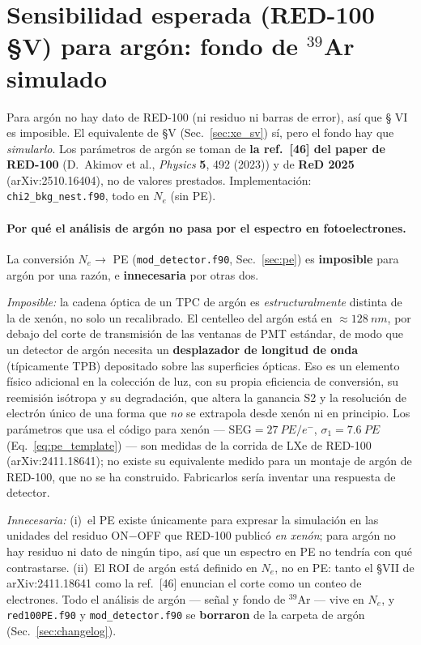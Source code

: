 \documentclass[11pt,a4paper]{article}
\newcommand{\Ne}{N_{e}}
\newcommand{\code}[1]{\texttt{#1}}
\begin{document}
\section{Sensibilidad esperada (RED-100 \S V) para arg\'on: fondo de
$^{39}$Ar simulado}
\label{sec:ar_sv}

Para arg\'on no hay dato de RED-100 (ni residuo ni barras de error), as\'i que \S
VI es imposible. El equivalente de \S V (Sec.~\ref{sec:xe_sv}) s\'i, pero el
fondo hay que \emph{simularlo}. Los par\'ametros de arg\'on se toman de
\textbf{la ref.\ [46] del paper de RED-100} (D.\ Akimov et al., \emph{Physics}
\textbf{5}, 492 (2023)) y de \textbf{ReD 2025} (arXiv:2510.16404), no de valores
prestados. Implementaci\'on: \code{chi2\_bkg\_nest.f90}, todo en $\Ne$ (sin PE).

\paragraph{Por qu\'e el an\'alisis de arg\'on no pasa por el espectro en
fotoelectrones.} La conversi\'on $\Ne\to$ PE (\code{mod\_detector.f90},
Sec.~\ref{sec:pe}) es \textbf{imposible} para arg\'on por una raz\'on, e
\textbf{innecesaria} por otras dos.

\emph{Imposible:} la cadena \'optica de un TPC de arg\'on es
\emph{estructuralmente} distinta de la de xen\'on, no solo un recalibrado. El
centelleo del arg\'on est\'a en $\approx\SI{128}{nm}$, por debajo del corte de
transmisi\'on de las ventanas de PMT est\'andar, de modo que un detector de
arg\'on necesita un \textbf{desplazador de longitud de onda} (t\'ipicamente TPB)
depositado sobre las superficies \'opticas. Eso es un elemento f\'isico
adicional en la colecci\'on de luz, con su propia eficiencia de conversi\'on, su
reemisi\'on is\'otropa y su degradaci\'on, que altera la ganancia S2 y la
resoluci\'on de electr\'on \'unico de una forma que \emph{no} se extrapola desde
xen\'on ni en principio. Los par\'ametros que usa el c\'odigo para xen\'on
--- $\mathrm{SEG}=\SI{27}{PE/e^{-}}$, $\sigma_{1}=\SI{7.6}{PE}$
(Eq.~\eqref{eq:pe_template}) --- son medidas de la corrida de LXe de RED-100
(arXiv:2411.18641); no existe su equivalente medido para un montaje de arg\'on
de RED-100, que no se ha construido. Fabricarlos ser\'ia inventar una respuesta
de detector.

\emph{Innecesaria:} (i)~el PE existe \'unicamente para expresar la simulaci\'on
en las unidades del residuo ON$-$OFF que RED-100 public\'o \emph{en xen\'on};
para arg\'on no hay residuo ni dato de ning\'un tipo, as\'i que un
espectro en PE no tendr\'ia con qu\'e contrastarse. (ii)~El ROI de arg\'on est\'a
definido en $\Ne$, no en PE: tanto el \S VII de arXiv:2411.18641 como la ref.\
[46] enuncian el corte como un conteo de electrones. Todo el an\'alisis de
arg\'on --- se\~nal y fondo de $^{39}$Ar --- vive en $\Ne$, y
\code{red100PE.f90} y \code{mod\_detector.f90} se \textbf{borraron} de la carpeta
de arg\'on (Sec.~\ref{sec:changelog}).
\end{document}
